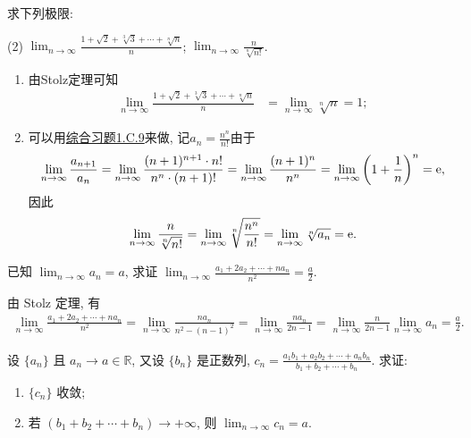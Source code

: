 \begin{exercise}[1.C.10]
    求下列极限:
    \begin{tasks}[label=(\arabic*)](2)
        \task $\lim_{n \to \infty} \frac{1+\sqrt{2}+\sqrt[3]{3}+\cdots+\sqrt[n]{n}}{n}$;
        \task $\lim_{n \to \infty} \frac{n}{\sqrt[n]{n!}}$.
    \end{tasks}
\end{exercise}

\begin{solution}
    \begin{enumerate}[(1)]
        \item 由Stolz定理可知
              \begin{align*}
                  \lim_{n \to \infty} \frac{1+\sqrt{2}+\sqrt[3]{3}+\cdots+\sqrt[n]{n}}{n} & = \lim_{n \to \infty} \sqrt[n]{n} = 1;
              \end{align*}
        \item 可以用\hyperref[exe:1.C.9]{综合习题1.C.9}来做, 记$a_n=\frac{n^n}{n!}$由于
              $$\lim_{n\to\infty}\frac{a_{n+1}}{a_n}=\lim_{n\to\infty}\frac{(n+1)^{n+1}\cdot n!}{n^n\cdot (n+1)!}=\lim_{n\to\infty}\frac{(n+1)^{n}}{n^n}=\lim_{n\to\infty}\left(1+\frac{1}{n}\right)^{n}=\mathrm{e}, $$
              因此$$\lim_{n \to \infty} \frac{n}{\sqrt[n]{n!}}=\lim_{n \to \infty}\sqrt[n]{\frac{n^n}{n!}}=\lim_{n \to \infty}\sqrt[n]{a_n}=\mathrm{e}.$$
    \end{enumerate}
\end{solution}

\begin{exercise}[1.C.11]
    已知 $\lim_{n \to \infty} a_n = a$,  求证 $\lim_{n \to \infty} \frac{a_1+2a_2+\cdots+na_n}{n^2} = \frac{a}{2}$.
\end{exercise}
\begin{solution}
    由 Stolz 定理,  有
    \begin{align*}
        \lim_{n \to \infty} \frac{a_1+2a_2+\cdots+na_n}{n^2} = \lim_{n \to \infty} \frac{na_n}{n^2 - (n-1)^2} = \lim_{n \to \infty} \frac{na_n}{2n-1} =\lim_{n \to \infty}\frac{n}{2n-1} \lim_{n \to \infty} a_n = \frac{a}{2}.
    \end{align*}
\end{solution}

\begin{exercise}[1.C.12]
    设 $\{a_n\}$ 且 $a_n \to a \in \mathbb{R}$,  又设 $\{b_n\}$ 是正数列,  $c_n = \frac{a_1b_1+a_2b_2+\cdots+a_nb_n}{b_1+b_2+\cdots+b_n}$. 求证:
    \begin{enumerate}[(1)]
        \item $\{c_n\}$ 收敛;
        \item 若 $(b_1+b_2+\cdots+b_n) \to +\infty$,  则 $\lim_{n \to \infty} c_n = a$.
    \end{enumerate}
\end{exercise}


